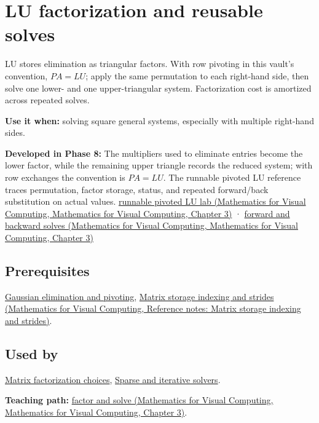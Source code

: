 \hypertarget{appendix-55e4b5b0a1e6}{}\label{referencestart:appendix-55e4b5b0a1e6}
\section{LU factorization and reusable solves}\label{appendix-55e4b5b0a1e6-lu-factorization-and-reusable-solves}

LU stores elimination as triangular factors. With row pivoting in this vault's convention, \(PA=LU\); apply the same permutation to each right-hand side, then solve one lower- and one upper-triangular system. Factorization cost is amortized across repeated solves.

\textbf{Use it when:} solving square general systems, especially with multiple right-hand sides.

\textbf{Developed in Phase 8:} The multipliers used to eliminate entries become the lower factor, while the remaining upper triangle records the reduced system; with row exchanges the convention is \(PA=LU\). The runnable pivoted LU reference traces permutation, factor storage, status, and repeated forward/back substitution on actual values. \href{../02-Mathematics-for-Visual-Computing/main.pdf\#nameddest=01-foundations-i-ch019-a-runnable-pivoted-lu-reference-preserves-the-elimination-history}{runnable pivoted LU lab (Mathematics for Visual Computing, Mathematics for Visual Computing, Chapter 3)} · \href{../02-Mathematics-for-Visual-Computing/main.pdf\#nameddest=01-foundations-i-ch019-triangular-solves-perform-the-cheap-second-half}{forward and backward solves (Mathematics for Visual Computing, Mathematics for Visual Computing, Chapter 3)}

\subsection{Prerequisites}\label{appendix-55e4b5b0a1e6-prerequisites}

\hyperref[appendix-f6e77f4a200f]{Gaussian elimination and pivoting}, \href{../02-Mathematics-for-Visual-Computing/main.pdf\#nameddest=appendix-ffdc1d4e5350}{Matrix storage indexing and strides (Mathematics for Visual Computing, Reference notes: Matrix storage indexing and strides)}.

\subsection{Used by}\label{appendix-55e4b5b0a1e6-used-by}

\hyperref[appendix-221a483bec2d]{Matrix factorization choices}, \hyperref[appendix-67c87a3d9e94]{Sparse and iterative solvers}.

\textbf{Teaching path:} \href{../02-Mathematics-for-Visual-Computing/main.pdf\#nameddest=01-foundations-i-ch019-elimination-turns-the-geometry-into-an-auditable-calculation}{factor and solve (Mathematics for Visual Computing, Mathematics for Visual Computing, Chapter 3)}.
